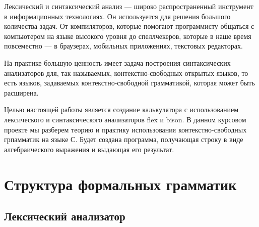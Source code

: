 \documentclass[bachelor, och, coursework, times]{SCWorks}
\begin{document}


\tableofcontents





\intro
Лексический и синтаксический анализ --- широко распространенный инструмент в информационных технологиях. Он используется для решения большого количества задач. От компиляторов, которые помогают программисту общаться с компьютером на языке высокого уровня до спеллчекеров, которые в наше время повсеместно --- в браузерах, мобильных приложениях, текстовых редакторах.

На практике большую ценность имеет задача построения синтаксических анализаторов для, так называемых, контекстно-свободных открытых языков, то есть языков, задаваемых контекстно-свободной грамматикой, которая может быть расширена.

Целью настоящей работы является создание калькулятора с использованием лексического и синтаксического анализаторов flex и bison. В данном курсовом проекте мы разберем теорию и практику использования контекстно-свободных грпамматик на языке С. Будет создана программа, получающая строку в виде алгебраического выражения и выдающая его результат.

\section{Структура формальных грамматик}
\subsection{Лексический анализатор}
\end{document}
